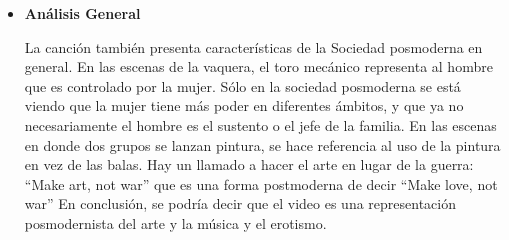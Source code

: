 \documentclass[a4paper,12pt]{article}
\begin{document}
\begin{itemize}
 \newpage
 
 \item \textbf{Análisis General}
 
 La canción también presenta características de la Sociedad posmoderna en general. En las escenas de la vaquera, el toro mecánico representa al hombre que es controlado por
 la mujer. Sólo en la sociedad posmoderna se está viendo que la mujer tiene más poder en diferentes ámbitos, y que ya no necesariamente el hombre es el sustento o el jefe de la familia.
 En las escenas en donde dos grupos se lanzan pintura, se hace referencia al uso de la pintura en vez de las balas. Hay un llamado a hacer el arte en lugar de la guerra:
 ``Make art, not war'' que es una forma postmoderna de decir ``Make love, not war''  En conclusión, se podría decir que el video es una representación posmodernista del
 arte y la música y el erotismo.
 
 
 
\end{itemize}
\end{document}
